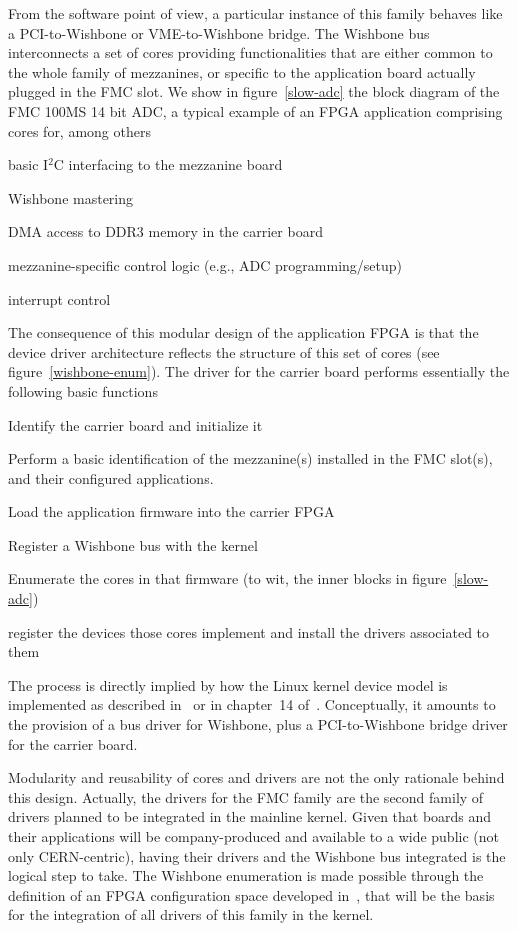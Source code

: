 \documentclass{JAC2003}
\begin{document}
From the software
point of view, a particular instance of this family behaves like a
PCI-to-Wishbone or VME-to-Wishbone bridge. The Wishbone bus
interconnects a set of cores providing functionalities that are either
common to the whole family of mezzanines, or specific to the application
board actually plugged in the FMC slot. We show in figure~\ref{slow-adc}
the block diagram of the FMC 100MS 14 bit ADC,
a typical example of an FPGA application comprising cores for, among
others
\begin{Itemize}
\item basic I${}^2$C interfacing to the mezzanine board
\item Wishbone mastering
\item DMA access to DDR3 memory in the carrier board
\item mezzanine-specific control logic (e.g., ADC programming/setup)
\item interrupt control
\end{Itemize}
The consequence of this modular design of the application FPGA is that
the device driver architecture reflects the structure of this set of
cores (see figure~\ref{wishbone-enum}). The driver for the carrier board
performs essentially the following basic functions
\begin{Itemize}
\item Identify the carrier board and initialize it
\item Perform a basic identification of the mezzanine(s) installed in
    the FMC slot(s), and their configured applications.
\item Load the application firmware into the carrier FPGA
\item Register a Wishbone bus with the kernel
\item Enumerate the cores in that firmware (to wit, the
    inner blocks in figure~\ref{slow-adc})
\item register the devices those cores implement and install the drivers 
    associated to them
\end{Itemize}
The process is directly implied by how the Linux kernel device
model is implemented as described in~\cite{device-model} or in chapter~14
of~\cite{rubini}. Conceptually, it amounts to the provision of a bus driver
for Wishbone, plus a PCI-to-Wishbone bridge driver for the
carrier board.

Modularity and reusability of cores and drivers are not the only
rationale behind this design. Actually, the drivers for the FMC family
are the second family of drivers planned to be integrated in the
mainline kernel. Given that boards and their applications will be
company-produced and available to a wide public (not only CERN-centric),
having their drivers and the Wishbone bus integrated is the logical step
to take. The Wishbone enumeration is made possible through the
definition of an FPGA configuration space developed
in~\cite{fpga-config-space}, that will be the basis for the integration of
all drivers of this family in the kernel.
\end{document}
